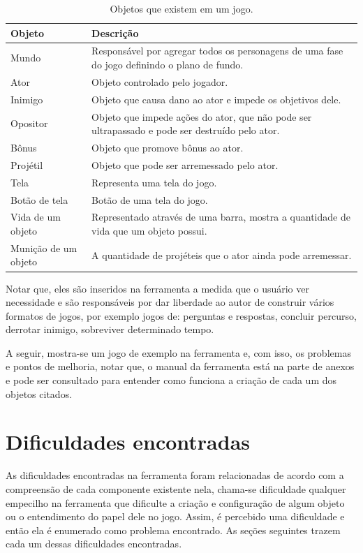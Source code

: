 \documentclass[12pt,twoside,openright,a4paper,english,brazil,sumario=tradicional]{abntex2}
\begin{document}
\begin{table}[h]
\centering
\begin{tabular}{| l | p{7cm} |}
      \hline
      \textbf{Objeto} & \textbf{Descrição} \\
      \hline
      Mundo & Responsável por agregar todos os personagens de uma fase do jogo definindo o plano de fundo.  \\
      \hline
      Ator & Objeto controlado pelo jogador. \\
      \hline
      Inimigo & Objeto que causa dano ao ator e impede os objetivos dele. \\
      \hline
      Opositor & Objeto que impede ações do ator, que não pode ser ultrapassado e pode ser destruído pelo ator.  \\
      \hline
      Bônus & Objeto que promove bônus ao ator. \\
      \hline
      Projétil & Objeto que pode ser arremessado pelo ator. \\
      \hline
      Tela & Representa uma tela do jogo. \\
      \hline
      Botão de tela & Botão de uma tela do jogo. \\
      \hline
      Vida de um objeto & Representado através de uma barra, mostra a quantidade de vida que um objeto possui. \\
      \hline
      Munição de um objeto & A quantidade de projéteis que o ator ainda pode arremessar. \\
      \hline
   \end{tabular}
\caption{Objetos que existem em um jogo.}
\label{table:objetos-desc}
\end{table}

Notar que, eles são inseridos na ferramenta a medida que o usuário ver necessidade e são responsáveis por dar liberdade ao autor de construir vários formatos de jogos, por exemplo jogos de: perguntas e respostas, concluir percurso, derrotar inimigo, sobreviver determinado tempo.

A seguir, mostra-se um jogo de exemplo na ferramenta e, com isso, os problemas e pontos de melhoria, notar que, o manual da ferramenta está na parte de anexos e pode ser consultado para entender como funciona a criação de cada um dos objetos citados.

\section{Dificuldades encontradas}
\label{sec:dificuldades}
As dificuldades encontradas na ferramenta foram relacionadas de acordo com a compreensão de cada componente existente nela, chama-se dificuldade qualquer empecilho na ferramenta que dificulte a criação e configuração de algum objeto ou o entendimento do papel dele no jogo. Assim, é percebido uma dificuldade e então ela é enumerado como problema encontrado. As seções seguintes trazem cada um dessas dificuldades encontradas.
\end{document}
